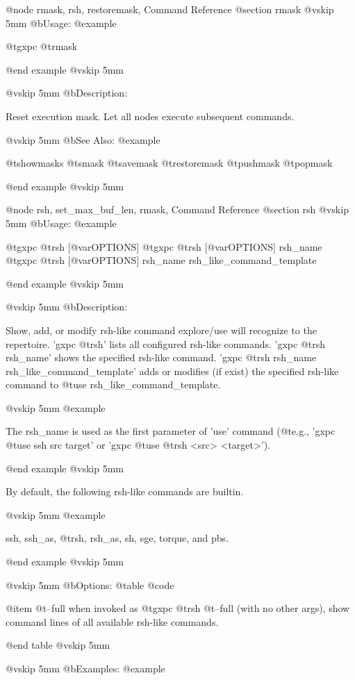 @node rmask, rsh, restoremask, Command Reference
@section rmask
@vskip 5mm
@b{Usage:}
@example

  @t{gxpc} @t{rmask}

@end example
@vskip 5mm

@vskip 5mm
@b{Description:}


  Reset execution mask. Let all nodes execute subsequent commands.

@vskip 5mm
@b{See Also:}
@example

  @t{showmasks} @t{smask} @t{savemask} @t{restoremask} @t{pushmask} @t{popmask}

@end example
@vskip 5mm

@node rsh, set_max_buf_len, rmask, Command Reference
@section rsh
@vskip 5mm
@b{Usage:}
@example

  @t{gxpc} @t{rsh} [@var{OPTIONS}]
  @t{gxpc} @t{rsh} [@var{OPTIONS}] rsh_name
  @t{gxpc} @t{rsh} [@var{OPTIONS}] rsh_name rsh_like_command_template

@end example
@vskip 5mm

@vskip 5mm
@b{Description:}


  Show, add, or modify rsh-like command explore/use will recognize
  to the repertoire.
  'gxpc @t{rsh}' lists all configured rsh-like commands.
  'gxpc @t{rsh} rsh_name' shows the specified rsh-like command.
  'gxpc @t{rsh} rsh_name rsh_like_command_template' adds or modifies (if exist)
  the specified rsh-like command to @t{use} rsh_like_command_template.

@vskip 5mm
@example

  The rsh_name is used as the first parameter of 'use' command (@t{e}.g.,
  'gxpc @t{use} ssh src target' or 'gxpc @t{use} @t{rsh} <src> <target>').

@end example
@vskip 5mm

  By default, the following rsh-like commands are builtin.

@vskip 5mm
@example

  ssh, ssh_as, @t{rsh}, rsh_as, sh, sge, torque, and pbs.

@end example
@vskip 5mm

@vskip 5mm
@b{Options:}
@table @code

@item   @t{--full}
    when invoked as @t{gxpc} @t{rsh} @t{--full} (with no other args),
    show command lines of all available rsh-like commands.

@end table
@vskip 5mm

@vskip 5mm
@b{Examples:}
@example

